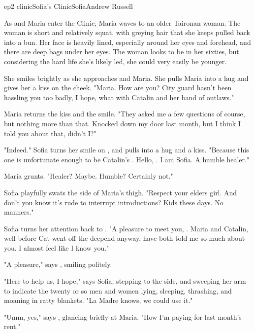 \documentclass{book}
\begin{document}
\begin{node}{ep2 clinic}{Sofia's Clinic}{Sofia}{Andrew Russell}

    As \name{} and Maria enter the Clinic, Maria waves to an older Taironan woman. The woman is short and relatively squat, with greying hair that she keeps pulled back into a bun. Her face is heavily lined, especially around her eyes and forehead, and there are 
    deep bags under her eyes. The woman looks to be in her sixties, but considering the hard life she's likely led, she could very easily be younger. 

    She smiles brightly as she approaches \name{} and Maria. She pulls Maria into a hug and gives her a kiss on the cheek. "Maria. How are you? City guard hasn't been hassling you too badly, I hope, what with Catalin and her band of outlaws."

    Maria returns the kiss and the smile. "They asked me a few questions of course, but nothing more than that. Knocked down my door last month, but I think I told you about that, didn't I?"

    "Indeed." Sofia turns her smile on \name{}, and pulls \himher{} into a hug and a kiss. "Because this one is unfortunate enough to be Catalin's \brothersister{}. Hello, \name{}. I am Sofia. A humble healer."

    Maria grunts. "Healer? Maybe. Humble? Certainly not."

    Sofia playfully swats the side of Maria's thigh. "Respect your elders girl. And don't you know it's rude to interrupt introductions? Kids these days. No manners." 

    Sofia turns her attention back to \name{}. "A pleasure to meet you, \name{}. Maria and Catalin, well before Cat went off the deepend anyway, have both told me so much about you. I almost feel like I know you."

    "A pleasure," says \name{}, smiling politely. 

    "Here to help us, I hope," says Sofia, stepping to the side, and sweeping her arm to indicate the twenty or so men and women lying, sleeping, thrashing, and moaning in ratty blankets. "La Madre knows, we could use it."

    "Umm, yes," says \name{}, glancing briefly at Maria. "How I'm paying for last month's rent."


\end{node}
\end{document}

